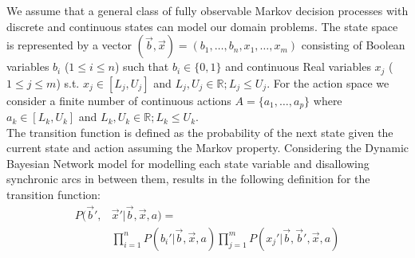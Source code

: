 \documentclass[letterpaper]{article}
\renewcommand{\-}{\text{-}}
\begin{document}
We assume that a general class of fully observable Markov decision processes with discrete and continuous states can model our domain problems.
 The state space is represented by a vector $(\vec{b},\vec{x}) = ( b_1,\ldots,b_n,x_{1},\ldots,x_m )$ consisting of Boolean variables
 $b_i$ ($1 \leq i \leq n$) such that $b_i \in \{ 0,1 \}$ and continuous Real variables $x_j$ ($1 \leq j \leq m$) s.t. $x_j \in [L_j,U_j]$ and $L_j,U_j \in
\mathbb{R}; L_j \leq U_j$.  For the action space we consider a finite number of continuous actions $A
= \{ a_1, \ldots, a_p \}$ where $a_k \in [L_k,U_k]$ and $L_k,U_k \in
\mathbb{R}; L_k \leq U_k$.
\\
The transition function is defined as the probability of the next state given the current state and action assuming the Markov property.  Considering the Dynamic Bayesian Network model for modelling each state variable and disallowing synchronic arcs in between them,  results in the following definition for the transition function:   
\begin{align}
P(\vec{b}',&\vec{x}'|\vec{b},\vec{x},a) = \label{eq:dbn} \\
& \prod_{i=1}^n P(b_i'|\vec{b},\vec{x},a) \prod_{j=1}^m P(x_j'|\vec{b},\vec{b}',\vec{x},a) \nonumber 
\end{align}
\end{document}
